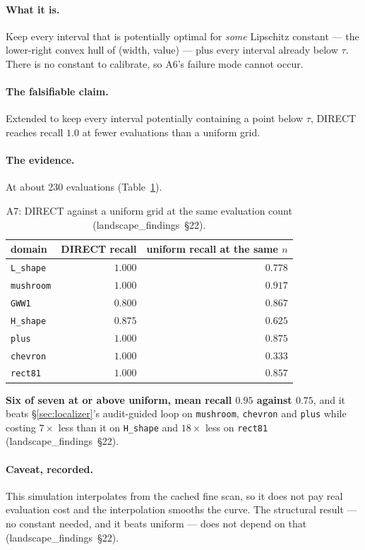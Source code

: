\documentclass[11pt]{article}
\newcommand{\file}[1]{\texttt{#1}}
\newcommand{\lf}[1]{(landscape\_findings~\S#1)}
\begin{document}
\paragraph{What it is.} Keep every interval that is potentially optimal for \emph{some} Lipschitz
constant --- the lower-right convex hull of (width, value) --- plus every interval already below
$\tau$. There is no constant to calibrate, so A6's failure mode cannot occur.

\paragraph{The falsifiable claim.} Extended to keep every interval potentially containing a point
below $\tau$, DIRECT reaches recall $1.0$ at fewer evaluations than a uniform grid.

\paragraph{The evidence.} At about 230 evaluations (Table~\ref{tab:a7}).

\begin{table}[htbp]
\centering
\caption{A7: DIRECT against a uniform grid at the same evaluation count \lf{22}.}
\label{tab:a7}
\begin{tabular}{lrr}
\toprule
domain & DIRECT recall & uniform recall at the same $n$ \\
\midrule
\file{L\_shape} & $1.000$ & $0.778$ \\
\file{mushroom} & $1.000$ & $0.917$ \\
\file{GWW1}     & $0.800$ & $0.867$ \\
\file{H\_shape} & $0.875$ & $0.625$ \\
\file{plus}     & $1.000$ & $0.875$ \\
\file{chevron}  & $1.000$ & $0.333$ \\
\file{rect81}   & $1.000$ & $0.857$ \\
\bottomrule
\end{tabular}
\end{table}

\textbf{Six of seven at or above uniform, mean recall $0.95$ against $0.75$}, and it beats
\S\ref{sec:localizer}'s audit-guided loop on \file{mushroom}, \file{chevron} and \file{plus} while
costing $7\times$ less than it on \file{H\_shape} and $18\times$ less on \file{rect81} \lf{22}.

\paragraph{Caveat, recorded.} This simulation interpolates from the cached fine scan, so it does
not pay real evaluation cost and the interpolation smooths the curve. The structural result --- no
constant needed, and it beats uniform --- does not depend on that \lf{22}.
\end{document}

